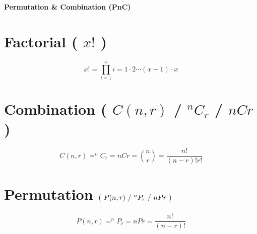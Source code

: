 \begingroup
\begin{center}
\fontsize{15}{15}\sffamily\selectfont
\textbf{Permutation \& Combination (PnC)}
\end{center}
\endgroup

\section{Factorial ( $x!$ )}\label{Factorial}
\[
    x! = \prod_{i=1}^{x} i = 1 \cdot 2 \cdots (x-1) \cdot x 
\]

\section{Combination ( $C(n,r)$ / $^nC_r$ / $nCr$ ) } \label{Combination}

\[
    C(n,r) = ^nC_r = nCr = \displaystyle\binom{n}{r} = \displaystyle\dfrac{n!}{(n-r)!r!}
\]

\section{Permutation \( \dParenBrac{\ P(n,r)\ /\ ^nP_r\ /\ nPr\ } \)} \label{Permutation}

\[
    P(n,r) = ^nP_r = nPr = \displaystyle\dfrac{n!}{(n-r)!}
\]
